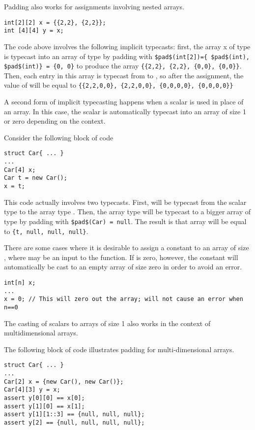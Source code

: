\begin{Example}
Padding also works for assignments involving nested arrays.
\begin{lstlisting}
int[2][2] x = {{2,2}, {2,2}};
int [4][4] y = x;
\end{lstlisting}

The code above involves the following implicit typecasts: first, the array x of type  is typecast into an array of type  by padding with \lstinline!$pad$(int[2])={ $pad$(int), $pad$(int)} = {0, 0}! to produce the array \lstinline!{{2,2}, {2,2}, {0,0}, {0,0}}!. Then, each entry in this array is typecast from  to , so after the assignment, the value of  will be equal to \lstinline!{{2,2,0,0}, {2,2,0,0}, {0,0,0,0}, {0,0,0,0}}!
\end{Example}


A second form of implicit typecasting happens when a scalar is used in place of an array. In this case, the scalar is automatically typecast into an array of size 1 or zero depending on the context.

\begin{Example}
Consider the following block of code
\begin{lstlisting}
struct Car{ ... }
...
Car[4] x;
Car t = new Car();
x = t;
\end{lstlisting}
This code actually involves two typecasts. First,  will be typecast from the scalar type  to the array type . Then, the array type  will be typecast to a bigger array of type  by padding with \lstinline!$pad$(Car) = null!. The result is that array will be equal to \lstinline!{t, null, null, null}!.
\end{Example}

There are some cases where it is desirable to assign a constant to an array of size , where  may be an input to the function. If  is zero, however, the constant will automatically be cast to an empty array of size zero in order to avoid an error.

\begin{Example}
\begin{lstlisting}
int[n] x;
...
x = 0; // This will zero out the array; will not cause an error when n==0
\end{lstlisting}
\end{Example}


The casting of scalars to arrays of size 1 also works in the context of multidimensional arrays.
\begin{Example}
The following block of code illustrates padding for multi-dimensional arrays.
\begin{lstlisting}
struct Car{ ... }
...
Car[2] x = {new Car(), new Car()};
Car[4][3] y = x;
assert y[0][0] == x[0];
assert y[1][0] == x[1];
assert y[1][1::3] == {null, null, null};
assert y[2] == {null, null, null, null};
\end{lstlisting}
\end{Example}

